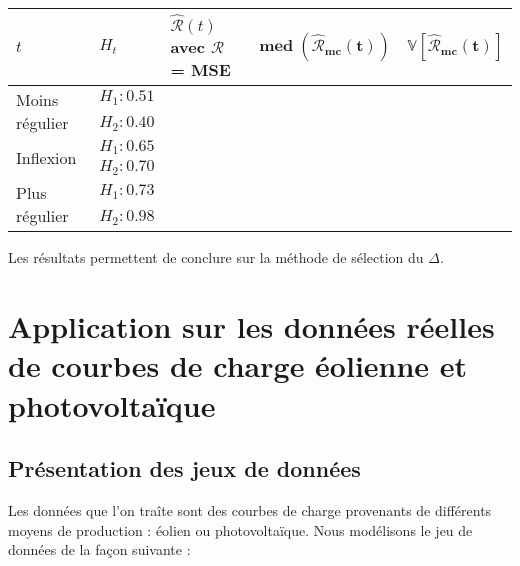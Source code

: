 \begin{table}[H]
	\centering
	\begin{tabularx}{\linewidth}{|X|X|X|X|X|}
		\toprule
		$t$                                  & $H_t$        & $\widehat{\mathcal R}(t)$ avec $\mathcal R$ = MSE & $\mathbf{\operatorname{med}(\widehat{\mathcal R}_{mc}(t))}$ & $\mathbf{\mathds V[\widehat{\mathcal R}_{mc}(t)]}$
		\\
		\midrule
		\multirow{2}{\hsize}{Moins régulier} & $H_1 : 0.51$ &                                          &                                                             &
		\\
		                                     & $H_2 : 0.40$ &                                          &                                                             &
		\\
		\midrule
		\multirow{2}{\hsize}{Inflexion}      & $H_1 : 0.65$ &                                          &                                                             &
		\\
		                                     & $H_2 : 0.70$ &                                          &                                                             &
		\\
		\midrule
		\multirow{2}{\hsize}{Plus régulier}  & $H_1 : 0.73$ &                                          &                                                             &
		\\
		                                     & $H_2 : 0.98$ &                                          &                                                             &
		\\
		\bottomrule
	\end{tabularx}
\end{table}

Les résultats permettent de conclure sur la méthode de sélection du $\Delta$.

\section{
  Application sur les données réelles de courbes de charge éolienne et photovoltaïque
 }

\subsection{Présentation des jeux de données}

Les données que l'on traîte sont des courbes de charge provenants de différents moyens de production : éolien ou photovoltaïque. Nous modélisons le jeu de données de la façon suivante :

